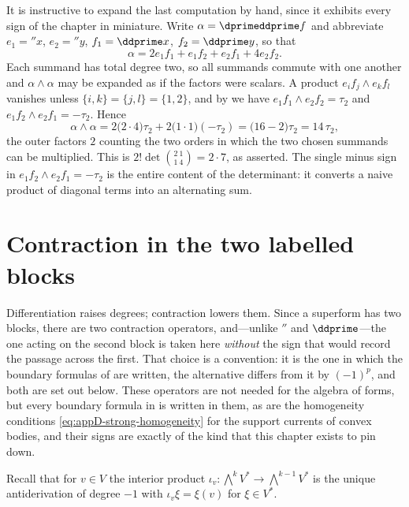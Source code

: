 It is instructive to expand the last computation by hand, since it exhibits
every sign of the chapter in miniature.  Write $\alpha=\dprimeddprime f$ and
abbreviate $e_1=\dprime x$, $e_2=\dprime y$, $f_1=\ddprime x$,
$f_2=\ddprime y$, so that
\[
 \alpha=2e_1f_1+e_1f_2+e_2f_1+4e_2f_2 .
\]
Each summand has total degree two, so all summands commute with one another
and $\alpha\wedge\alpha$ may be expanded as if the factors were scalars.  A
product $e_if_j\wedge e_kf_l$ vanishes unless $\{i,k\}=\{j,l\}=\{1,2\}$, and
by  we have $e_1f_1\wedge e_2f_2=\tau_2$ and
$e_1f_2\wedge e_2f_1=-\tau_2$.  Hence
\[
 \alpha\wedge\alpha
 =2\bigl(2\cdot4\bigr)\tau_2+2\bigl(1\cdot1\bigr)(-\tau_2)
 =\bigl(16-2\bigr)\tau_2=14\,\tau_2,
\]
the outer factors $2$ counting the two orders in which the two chosen
summands can be multiplied.  This is $2!\det\binom{2\ 1}{1\ 4}=2\cdot7$, as
asserted.  The single minus sign in $e_1f_2\wedge e_2f_1=-\tau_2$ is the
entire content of the determinant: it converts a naive product of diagonal
terms into an alternating sum.

\section{Contraction in the two labelled blocks}
\label{sec:ch09-contraction}

Differentiation raises degrees; contraction lowers them.  Since a superform
has two blocks, there are two contraction operators, and---unlike
$\dprime$ and $\ddprime$---the one acting on the second block is taken here
\emph{without} the sign that would record the passage across the first.  That
choice is a convention: it is the one in which the boundary formulas of
 are written, the alternative differs from it
by $(-1)^p$, and both are set out below.  These operators are not needed
for the algebra of forms, but every boundary formula in
 is written in them, as are the homogeneity
conditions \eqref{eq:appD-strong-homogeneity} for the support currents of
convex bodies, and their signs are exactly of the kind that this chapter
exists to pin down.

Recall that for $v\in V$ the interior product
$\iota_v:\bigwedge^kV^*\to\bigwedge^{k-1}V^*$ is the unique antiderivation of
degree $-1$ with $\iota_v\xi=\xi(v)$ for $\xi\in V^*$.


